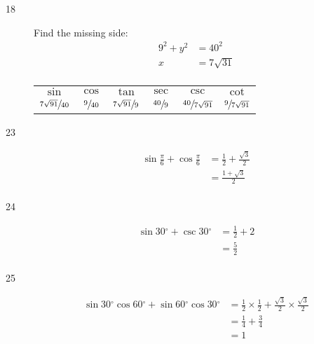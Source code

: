 \documentclass{exam}
\newcommand{\degree}{\ensuremath{^\circ}}
\begin{document}
\begin{description}
      \item[18] 
        Find the missing side:
        \begin{align*}
          9^2 + y^2 & = 40^2 \\
          x         & = 7 \sqrt{31} \\
        \end{align*}

        \begin{tabular}[H]{cccccc}
          \toprule
          $\sin$                    & $\cos$          & $\tan$                   & $\sec$          & $\csc$                    & $\cot$ \\
          $\sfrac{7 \sqrt{91}}{40}$ & $\sfrac{9}{40}$ & $\sfrac{7 \sqrt{91}}{9}$ & $\sfrac{40}{9}$ & $\sfrac{40}{7 \sqrt{91}}$ & $\sfrac{9}{7 \sqrt{91}}$ \\
          \bottomrule
        \end{tabular}

      \item[23]
        \begin{align*}
          \sin \frac{\pi}{6} + \cos \frac{\pi}{6} & = \frac{1}{2} + \frac{\sqrt{3}}{2} \\
                                                  & = \boxed{ \frac{1 + \sqrt{3}}{2} } \\
        \end{align*}

      \item[24]
        \begin{align*}
          \sin 30 \degree + \csc 30 \degree & = \frac{1}{2} + 2 \\
                                            & = \boxed{ \frac{5}{2} } \\
        \end{align*}

      \item[25]
        \begin{align*}
          \sin 30 \degree \cos 60 \degree + \sin 60 \degree \cos 30 \degree               & =
            \frac{1}{2} \times \frac{1}{2} + \frac{\sqrt{3}}{2} \times \frac{\sqrt{3}}{2} \\
                                                                                          & = \frac{1}{4} + \frac{3}{4} \\
                                                                                          &= \boxed{ 1 } \\
        \end{align*}


\end{description}
\end{document}
